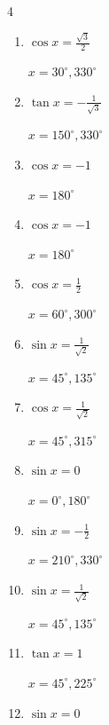 \begin{multicols}{4}
\begin{enumerate}
        $\displaystyle x = 60^{\circ} , 300^{\circ}$

  \item $\displaystyle \cos{x}  = \frac{\sqrt{3}}{2}$

        $\displaystyle x = 30^{\circ} , 330^{\circ}$

  \item $\displaystyle \tan{x}  = -\frac{1}{\sqrt{3}}$

        $\displaystyle x = 150^{\circ} , 330^{\circ}$

  \item $\displaystyle \cos{x}  = -1$

        $\displaystyle x = 180^{\circ}$

  \item $\displaystyle \cos{x}  = -1$

        $\displaystyle x = 180^{\circ}$

  \item $\displaystyle \cos{x}  = \frac{1}{2}$

        $\displaystyle x = 60^{\circ} , 300^{\circ}$

  \item $\displaystyle \sin{x}  = \frac{1}{\sqrt{2}}$

        $\displaystyle x = 45^{\circ} , 135^{\circ}$

  \item $\displaystyle \cos{x}  = \frac{1}{\sqrt{2}}$

        $\displaystyle x = 45^{\circ} , 315^{\circ}$

  \item $\displaystyle \sin{x}  = 0$

        $\displaystyle x = 0^{\circ} , 180^{\circ}$

  \item $\displaystyle \sin{x}  = -\frac{1}{2}$

        $\displaystyle x = 210^{\circ} , 330^{\circ}$

  \item $\displaystyle \sin{x}  = \frac{1}{\sqrt{2}}$

        $\displaystyle x = 45^{\circ} , 135^{\circ}$

  \item $\displaystyle \tan{x}  = 1$

        $\displaystyle x = 45^{\circ} , 225^{\circ}$

  \item $\displaystyle \sin{x}  = 0$


\end{enumerate}
\end{multicols}
